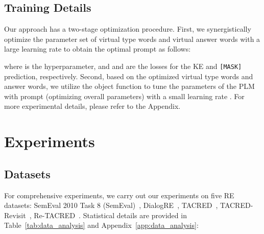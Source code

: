 \documentclass[sigconf]{acmart}
\begin{document}
\subsection{Training Details}
Our approach has a two-stage optimization procedure. 
First, we synergistically optimize the parameter set  of virtual type words and virtual answer words with a large learning rate  to obtain the optimal prompt as follows:

where  is the hyperparameter, and  and  are the losses for the KE and \texttt{[MASK]} prediction, respectively. Second, based on the optimized virtual type words and answer words, we utilize the object function  to tune the parameters of the PLM with prompt (optimizing overall parameters) with a small learning rate .
For more experimental details, please refer to the Appendix.
 
 




\section{Experiments}


\subsection{Datasets}
For comprehensive experiments, we carry out our experiments on five RE datasets:
SemEval 2010 Task 8 (SemEval)~\cite{hendrickx2010semeval},
DialogRE~\cite{DBLP:conf/acl/YuSCY20},
TACRED~\cite{zhang2017position},
TACRED-Revisit~\cite{alt2020tacred}, Re-TACRED~\cite{stoica2021re}. 
Statistical details are provided in Table~\ref{tab:data_analysis}
and Appendix~\ref{app:data_analysis}:
\end{document}
